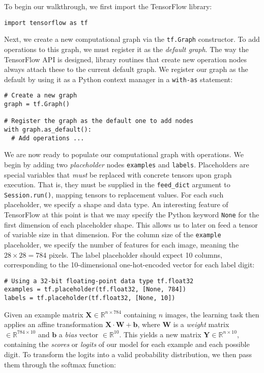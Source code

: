 To begin our walkthrough, we first import the TensorFlow library:

\begin{lstlisting}
import tensorflow as tf
\end{lstlisting}

Next, we create a new computational graph via the \texttt{tf.Graph}
constructor. To add operations to this graph, we must register it as the
\emph{default graph}. The way the TensorFlow API is designed, library routines
that create new operation nodes always attach these to the current default
graph. We register our graph as the default by using it as a Python context
manager in a \texttt{with-as} statement:

\begin{lstlisting}
# Create a new graph
graph = tf.Graph()

# Register the graph as the default one to add nodes
with graph.as_default():
  # Add operations ...
\end{lstlisting}

We are now ready to populate our computational graph with operations. We begin
by adding two \emph{placeholder} nodes \texttt{examples} and
\texttt{labels}. Placeholders are special variables that \emph{must} be replaced
with concrete tensors upon graph execution. That is, they must be supplied in
the \texttt{feed\_dict} argument to \texttt{Session.run()}, mapping tensors to
replacement values. For each such placeholder, we specify a shape and
data type. An interesting feature of TensorFlow at this point is that we may
specify the Python keyword \texttt{None} for the first dimension of each
placeholder shape. This allows us to later on feed a tensor of variable size in
that dimension. For the column size of the \texttt{example} placeholder, we
specify the number of features for each image, meaning the $28 \times 28 = 784$
pixels. The label placeholder should expect 10 columns, corresponding to the
10-dimensional one-hot-encoded vector for each label digit:

\begin{lstlisting}
# Using a 32-bit floating-point data type tf.float32
examples = tf.placeholder(tf.float32, [None, 784])
labels = tf.placeholder(tf.float32, [None, 10])
\end{lstlisting}

Given an example matrix $\mathbf{X} \in \mathbb{R}^{n \times 784}$ containing
$n$ images, the learning task then applies an affine transformation
$\mathbf{X} \cdot \mathbf{W} + \mathbf{b}$, where $\mathbf{W}$ is a
\emph{weight} matrix $\in \mathbb{R}^{784 \times 10}$ and $\mathbf{b}$ a
\emph{bias} vector $\in \mathbb{R}^{10}$. This yields a new matrix
$\mathbf{Y} \in \mathbb{R}^{n \times 10}$, containing the \emph{scores} or
\emph{logits} of our model for each example and each possible digit. To
transform the logits into a valid probability distribution, we then pass them
through the softmax function:

